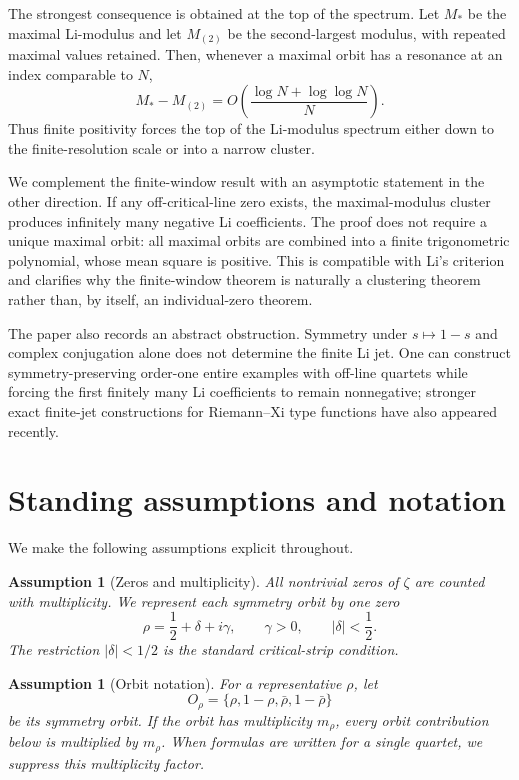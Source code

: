 \documentclass[11pt]{article}
\newtheorem{assumption}[theorem]{Assumption}
\newcommand{\zetaR}{\zeta}
\begin{document}
The strongest consequence is obtained at the top of the spectrum. Let \(M_*\) be the maximal Li-modulus and let \(M_{(2)}\) be the second-largest modulus, with repeated maximal values retained. Then, whenever a maximal orbit has a resonance at an index comparable to \(N\),
\[
M_*-M_{(2)}=O\!\left(\frac{\log N+\log\log N}{N}\right).
\]
Thus finite positivity forces the top of the Li-modulus spectrum either down to the finite-resolution scale or into a narrow cluster.

We complement the finite-window result with an asymptotic statement in the other direction. If any off-critical-line zero exists, the maximal-modulus cluster produces infinitely many negative Li coefficients. The proof does not require a unique maximal orbit: all maximal orbits are combined into a finite trigonometric polynomial, whose mean square is positive. This is compatible with Li's criterion and clarifies why the finite-window theorem is naturally a clustering theorem rather than, by itself, an individual-zero theorem.

The paper also records an abstract obstruction. Symmetry under \(s\mapsto1-s\) and complex conjugation alone does not determine the finite Li jet. One can construct symmetry-preserving order-one entire examples with off-line quartets while forcing the first finitely many Li coefficients to remain nonnegative; stronger exact finite-jet constructions for Riemann--Xi type functions have also appeared recently. \cite{Liu2026}

\section{Standing assumptions and notation}

We make the following assumptions explicit throughout.

\begin{assumption}[Zeros and multiplicity]
All nontrivial zeros of \(\zetaR\) are counted with multiplicity. We represent each symmetry orbit by one zero
\[
\rho=\frac12+\delta+i\gamma,\qquad \gamma>0,\qquad |\delta|<\frac12.
\]
The restriction \(|\delta|<1/2\) is the standard critical-strip condition.
\end{assumption}

\begin{assumption}[Orbit notation]
For a representative \(\rho\), let
\[
O_\rho=\{\rho,1-\rho,\bar\rho,1-\bar\rho\}
\]
be its symmetry orbit. If the orbit has multiplicity \(m_\rho\), every orbit contribution below is multiplied by \(m_\rho\). When formulas are written for a single quartet, we suppress this multiplicity factor.
\end{assumption}
\end{document}
